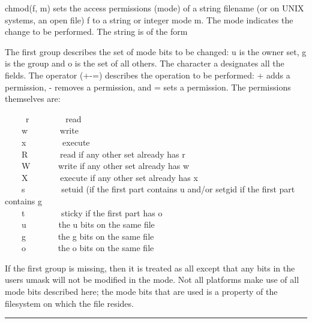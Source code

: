 \noindent
{}\textsf{chmod(f,
m)} sets the access permissions ({\textquotedbl}mode{\textquotedbl}) of
a string filename (or on UNIX systems, an open file) \textsf{f} to a
string or integer mode \textsf{m}. The mode indicates the change to be
performed. The string is of the form

\iconcode{
\>   [ugoa]*[+-=][rwxRWXstugo]* }

The first group describes the set of mode bits to be changed: \textsf{u}
is the owner set, \textsf{g} is the group and \textsf{o} is the set of
all others. The character \textsf{a} designates all the fields. The
operator (\textsf{+-=}) describes the operation to be performed:
\textsf{+} adds a permission, \textsf{{}-} removes a permission, and
\textsf{=} sets a permission. The permissions themselves are: 

\ \ \ \ \ \textsf{r} \ \ \ \ \ \ \ \ read\\
 \ \ \ \ \textsf{w} \ \ \ \ \ \ \ write\\
 \ \ \ \ \textsf{x} \ \ \ \ \ \ \ \ execute\\
 \ \ \ \ \textsf{R} \ \ \ \ \ \ \ read if any other set already has
r\\
 \ \ \ \ \textsf{W} \ \ \ \ \ \ write if any other set already has
w\\
 \ \ \ \ \textsf{X} \ \ \ \ \ \ \ execute if any other set already has
x\\
 \ \ \ \ \textsf{s} \ \ \ \ \ \ \ \ setuid (if the first part contains u
and/or setgid if the first part contains g\\
 \ \ \ \ \textsf{t} \ \ \ \ \ \ \ \ sticky if the first part has
o\\
 \ \ \ \ \textsf{u} \ \ \ \ \ \ \ the u bits on the same file\\
 \ \ \ \ \textsf{g} \ \ \ \ \ \ \ the g bits on the same file\\
 \ \ \ \ \textsf{o} \ \ \ \ \ \ \ the o bits on the same file

If the first group is missing, then it is treated as
{\textquotedbl}all{\textquotedbl} except that any bits in the
user{\textquotesingle}s umask will not be modified in the mode. Not all
platforms make use of all mode bits described here; the mode bits that
are used is a property of the filesystem on which the file resides.

\bigskip\hrule\vspace{0.1cm}

